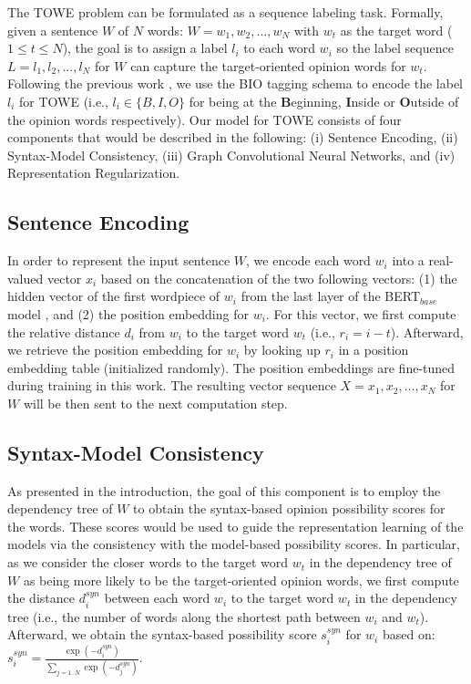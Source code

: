 \documentclass[11pt,a4paper]{article}
\begin{document}
The TOWE problem can be formulated as a sequence labeling task. Formally, given a sentence $W$ of $N$ words: $W=w_1,w_2,\ldots,w_N$ with $w_t$ as the target word ($1 \le t \le N$), the goal is to assign a label $l_i$ to each word $w_i$ so the label sequence  $L=l_1,l_2,...,l_N$ for $W$ can capture the target-oriented opinion words for $w_t$. Following the previous work \citep{fan2019target}, we use the BIO tagging schema to encode the label $l_i$ for TOWE (i.e., $l_i \in \{B, I, O\}$ for being at the \textbf{B}eginning, \textbf{I}nside or \textbf{O}utside of the opinion words respectively). Our model for TOWE consists of four components that would be described in the following: (i) Sentence Encoding, (ii) Syntax-Model Consistency, (iii) Graph Convolutional Neural Networks, and (iv) Representation Regularization.



\subsection{Sentence Encoding}







In order to represent the input sentence $W$, we encode each word $w_i$ into a real-valued vector $x_i$ based on the concatenation of the two following vectors: (1) the hidden vector of the first wordpiece of $w_i$ from the last layer of the BERT$_{base}$ model \cite{Devlin:19}, and (2) the position embedding for $w_i$. For this vector, we first compute the relative distance $d_i$ from $w_i$ to the target word $w_t$ (i.e., $r_i = i-t$). Afterward, we retrieve the position embedding for $w_i$ by looking up $r_i$ in a position embedding table (initialized randomly). The position embeddings are fine-tuned during training in this work. The resulting vector sequence $X=x_1,x_2,\ldots,x_N$ for $W$ will be then sent to the next computation step.



\subsection{Syntax-Model Consistency}
\label{sec:importance-encoder}

As presented in the introduction, the goal of this component is to employ the dependency tree of $W$ to obtain the syntax-based opinion possibility scores for the words. These scores would be used to guide the representation learning of the models via the consistency with the model-based possibility scores. In particular, as we consider the closer words to the target word $w_t$ in the dependency tree of $W$ as being more likely to be the target-oriented opinion words, we first compute the distance $d^{syn}_i$ between each word $w_i$ to the target word $w_t$ in the dependency tree (i.e., the number of words along the shortest path between $w_i$ and $w_t$). Afterward, we obtain the syntax-based possibility score $s^{syn}_i$ for $w_i$ based on: $s^{syn}_i = \frac{\exp(-d^{syn}_i)}{\sum_{j=1..N}\exp(-d^{syn}_j)}$.
\end{document}
